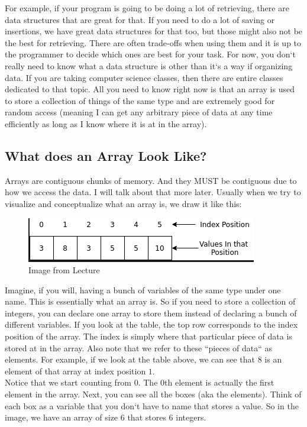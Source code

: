 \documentclass[11]{article}
\begin{document}
For example, if your program is going to be doing a lot of retrieving, there are data structures that are great for that. If you need to do a lot of saving or insertions, we have great data structures for that too, but those might also not be the best for retrieving. There are often trade-offs when using them and it is up to the programmer to decide which ones are best for your task. For now, you don`t really need to know what a data structure is other than it`s a way if organizing data. If you are taking computer science classes, then there are entire classes dedicated to that topic. All you need to know right now is that an array is used to store a collection of things of the same type and are extremely good for random access (meaning I can get any arbitrary piece of data at any time efficiently as long as I know where it is at in the array).
\subsection{What does an Array Look Like?}
Arrays are contiguous chunks of memory. And they MUST be contiguous due to how we access the data. I will talk about that more later. Usually when we try to visualize and conceptualize what an array is, we draw it like this:\\

\begin{figure}[H]
	\centering
	\includegraphics[scale=0.5]{arrays1.png}
	\caption{Image from Lecture}
\end{figure}

Imagine, if you will, having a bunch of variables of the same type under one name. This is essentially what an array is. So if you need to store a collection of integers, you can declare one array to store them instead of declaring a bunch of different variables. If you look at the table, the top row corresponds to the index position of the array. The index is simply where that particular piece of data is stored at in the array. Also note that we refer to these ``pieces of data`` as elements. For example, if we look at the table above, we can see that $8$ is an element of that array at index position $1$. \\

Notice that we start counting from $0$. The $0$th element is actually the first element in the array. Next, you can see all the boxes (aka the elements). Think of each box as a variable that you don`t have to name that stores a value. So in the image, we have an array of size $6$ that stores $6$ integers.\\
\end{document}
